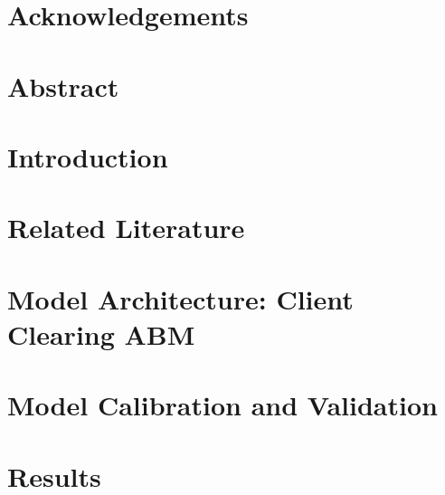\documentclass[11pt,a4paper,oneside]{report}
\begin{document}

\chapter*{Acknowledgements}


\clearpage

\clearpage
{}

\chapter*{Abstract}


\clearpage
\tableofcontents
\clearpage


\chapter{Introduction}\label{ch:intro}


\chapter{Related Literature}\label{ch:related}


\chapter{Model Architecture: Client Clearing ABM}\label{ch:model}


\chapter{Model Calibration and Validation}\label{ch:calibration}


\chapter{Results}\label{ch:results}

\end{document}
